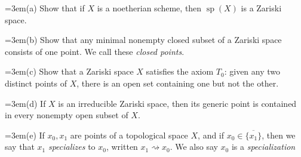 {\noindent\hangindent=3em\hspace*{1.7em}(a) Show that if $X$ is a noetherian scheme, then $\operatorname{sp}(X)$ is a Zariski space.

\noindent\hangindent=3em\hspace*{1.7em}(b) Show that any minimal nonempty closed subset of a Zariski space consists of one point. We call these \emph{closed points}.

\noindent\hangindent=3em\hspace*{1.7em}(c) Show that a Zariski space $X$ satisfies the axiom $T_0$: given any two distinct points of $X$, there is an open set containing one but not the other.

\noindent\hangindent=3em\hspace*{1.7em}(d) If $X$ is an irreducible Zariski space, then its generic point is contained in every nonempty open subset of $X$.

\noindent\hangindent=3em\hspace*{1.7em}(e) If $x_0,x_1$ are points of a topological space $X$, and if $x_0\in\overline{\{x_1\}}$, then we say that $x_1$ \emph{specializes} to $x_0$, written $x_1\rightsquigarrow x_0$. We also say $x_0$ is a \emph{specialization}}
